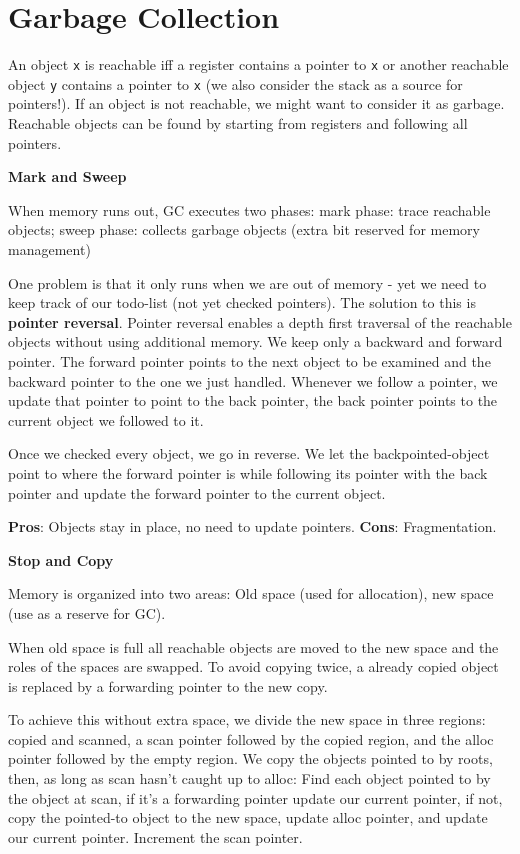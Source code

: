 \section*{Garbage Collection}

An object \texttt{x} is reachable iff a register contains a pointer to \texttt{x} or another reachable object \texttt{y} contains a pointer to \texttt{x} (we also consider the stack as a source for pointers!). If an object is not reachable, we might want to consider it as garbage. Reachable objects can be found by starting from registers and following all pointers. \medskip

\textbf{Mark and Sweep} \smallskip
	
When memory runs out, GC executes two phases: mark phase: trace reachable objects; sweep phase: collects garbage objects (extra bit reserved for memory management)\medskip
	
One problem is that it only runs when we are out of memory - yet we need to keep track of our todo-list (not yet checked pointers). The solution to this is \textbf{pointer reversal}. Pointer reversal enables a depth first traversal of the reachable objects without using additional memory. We keep only a backward and forward pointer. The forward pointer points to the next object to be examined and the backward pointer to the one we just handled. Whenever we follow a pointer, we update that pointer to point to the back pointer, the back pointer points to the current object we followed to it. \medskip 

Once we checked every object, we go in reverse. We let the backpointed-object point to where the forward pointer is while following its pointer with the back pointer and update the forward pointer to the current object. \medskip

\textbf{Pros}: Objects stay in place, no need to update pointers. \textbf{Cons}: Fragmentation.\medskip
	
\textbf{Stop and Copy} \smallskip
	
Memory is organized into two areas: Old space (used for allocation), new space (use as a reserve for GC). \medskip
	
When old space is full all reachable objects are moved to the new space and the roles of the spaces are swapped. To avoid copying twice, a already copied object is replaced by a forwarding pointer to the new copy. \medskip

To achieve this without extra space, we divide the new space in three regions: copied and scanned, a scan pointer followed by the copied region, and the alloc pointer followed by the empty region. We copy the objects pointed to by roots, then, as long as scan hasn't caught up to alloc: Find each object pointed to by the object at scan, if it's a forwarding pointer update our current pointer, if not, copy the pointed-to object to the new space, update alloc pointer, and update our current pointer. Increment the scan pointer. \medskip

